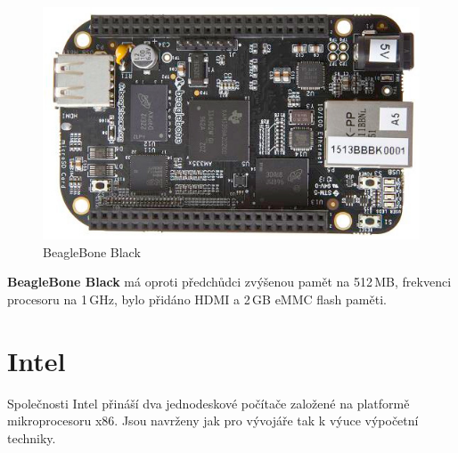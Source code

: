 	\begin{figure}[!h]
  \begin{center}
    \includegraphics[scale=0.7]{obrazky/embed_beaglebone_black}
  \end{center}
  \caption{BeagleBone Black~\cite{BeagleBone}}
\end{figure}

\textbf{BeagleBone Black} má oproti předchůdci zvýšenou pamět na 512\,MB, frekvenci procesoru na 1\,GHz, bylo přidáno HDMI a 2\,GB eMMC flash paměti.


\section{Intel}
\label{KapIntel}

Společnosti Intel přináší dva jednodeskové počítače založené na platformě mikroprocesoru x86. Jsou navrženy jak pro vývojáře tak k výuce výpočetní techniky.

